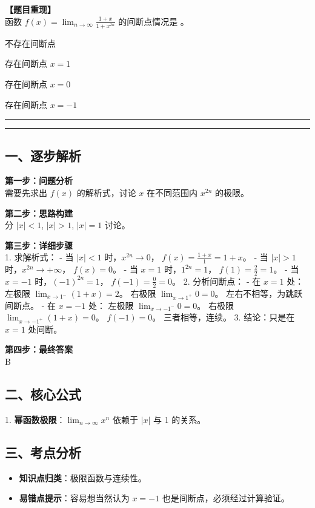 \documentclass[12pt, a4paper]{ctexart}
\newcommand{\AnalysisSeparator}{
    \par\noindent\rule{\textwidth}{0.5pt}\vspace{0.2em}\hrule\vspace{0.5em} %
}
\newenvironment{RedAnalysis}{
    \par
    \color{red} %
}{
    \par
    \color{black} %
}
\newcommand{\choicesTwo}[4]{
    \begin{enumerate}[label=\Alph*., itemsep=0pt, parsep=0pt, topsep=5pt, labelsep=0.5em]
        \begin{minipage}{0.45\linewidth} \item #1 \end{minipage}
        \begin{minipage}{0.45\linewidth} \item #2 \end{minipage}
        \begin{minipage}{0.45\linewidth} \item #3 \end{minipage}
        \begin{minipage}{0.45\linewidth} \item #4 \end{minipage}
    \end{enumerate}
}
\begin{document}
\textbf{【题目重现】} \\
函数 $ f(x)=\lim_{n\to\infty}\frac{1+x}{1+x^{2n}} $ 的间断点情况是 \underline{\hspace{1cm}}。
\choicesTwo
    {不存在间断点}
    {存在间断点 $ x = 1 $}
    {存在间断点 $ x = 0 $}
    {存在间断点 $ x = -1 $}

\AnalysisSeparator

\begin{RedAnalysis}

\subsection*{一、逐步解析}

\textbf{第一步：问题分析} \\
需要先求出 $f(x)$ 的解析式，讨论 $x$ 在不同范围内 $x^{2n}$ 的极限。

\textbf{第二步：思路构建} \\
分 $|x| < 1$, $|x| > 1$, $|x| = 1$ 讨论。

\textbf{第三步：详细步骤} \\
1. 求解析式：
   - 当 $|x| < 1$ 时，$x^{2n} \to 0$， $f(x) = \frac{1+x}{1} = 1+x$。
   - 当 $|x| > 1$ 时，$x^{2n} \to +\infty$， $f(x) = 0$。
   - 当 $x = 1$ 时，$1^{2n}=1$， $f(1) = \frac{2}{2} = 1$。
   - 当 $x = -1$ 时，$(-1)^{2n}=1$， $f(-1) = \frac{0}{2} = 0$。
2. 分析间断点：
   - 在 $x=1$ 处：
     左极限 $\lim_{x\to 1^-} (1+x) = 2$。
     右极限 $\lim_{x\to 1^+} 0 = 0$。
     左右不相等，为跳跃间断点。
   - 在 $x=-1$ 处：
     左极限 $\lim_{x\to -1^-} 0 = 0$。
     右极限 $\lim_{x\to -1^+} (1+x) = 0$。
     $f(-1)=0$。
     三者相等，连续。
3. 结论：只是在 $x=1$ 处间断。

\textbf{第四步：最终答案} \\
B

\subsection*{二、核心公式}
1. \textbf{幂函数极限}：$\lim_{n\to\infty} x^n$ 依赖于 $|x|$ 与 1 的关系。

\subsection*{三、考点分析}
\begin{itemize}
    \item \textbf{知识点归类}：极限函数与连续性。
    \item \textbf{易错点提示}：容易想当然认为 $x=-1$ 也是间断点，必须经过计算验证。
\end{itemize}

\end{RedAnalysis}
\end{document}
